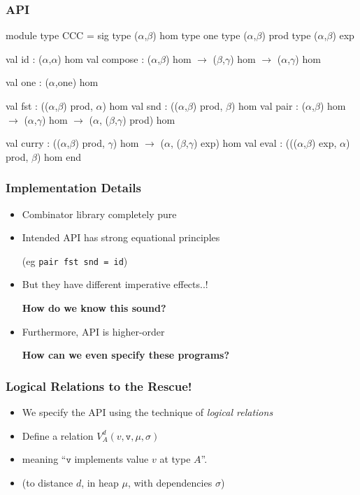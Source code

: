 \documentclass{beamer}
\begin{document}
\begin{frame}[fragile]
\frametitle{API}
{\small
\begin{semiverbatim}
module type CCC = sig
  type (\(\alpha\),\(\beta\)) hom
  type one
  type (\(\alpha\),\(\beta\)) prod
  type (\(\alpha\),\(\beta\)) exp

  val id : (\(\alpha\),\(\alpha\)) hom
  val compose : (\(\alpha\),\(\beta\)) hom \(\to\) (\(\beta\),\(\gamma\)) hom \(\to\) (\(\alpha\),\(\gamma\)) hom

  val one : (\(\alpha\),one) hom

  val fst : ((\(\alpha\),\(\beta\)) prod, \(\alpha\)) hom 
  val snd : ((\(\alpha\),\(\beta\)) prod, \(\beta\)) hom 
  val pair : (\(\alpha\),\(\beta\)) hom \(\to\) (\(\alpha\),\(\gamma\)) hom \(\to\) (\(\alpha\), (\(\beta\),\(\gamma\)) prod) hom

  val curry : ((\(\alpha\),\(\beta\)) prod, \(\gamma\)) hom \(\to\) (\(\alpha\), (\(\beta\),\(\gamma\)) exp) hom
  val eval : (((\(\alpha\),\(\beta\)) exp, \(\alpha\)) prod, \(\beta\)) hom
end
\end{semiverbatim}
}
\end{frame}

\begin{frame}
\frametitle{Implementation Details}

\begin{itemize}
\item Combinator library completely pure 
\item Intended API has strong equational principles 

(eg \texttt{pair fst snd = id})
\item \pause But they have different imperative effects..!

 \textbf{How do we know this sound?}
\item \pause Furthermore, API is higher-order

 \textbf{How can we even specify these programs?}
\end{itemize}
\end{frame}


\begin{frame}
\frametitle{Logical Relations to the Rescue!}

\begin{itemize}
\item We specify the API using the technique of \emph{logical relations}
\item Define a relation $V^d_A(v, \mathtt{v}, \mu, \sigma)$
\item meaning ``$\mathtt{v}$ implements value $v$ at type $A$''. 
\item {\scriptsize(to distance $d$, in heap $\mu$, with dependencies $\sigma$)}
\end{itemize}

\end{frame}
\end{document}
